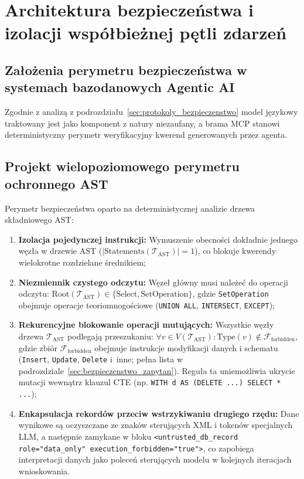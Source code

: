 \section{Architektura bezpieczeństwa i izolacji współbieżnej pętli zdarzeń}
\label{sec:projekt_bezpieczenstwo}

\subsection{Założenia perymetru bezpieczeństwa w systemach bazodanowych Agentic AI}
\label{subsec:projekt_model_zagrozen}

Zgodnie z analizą z podrozdziału~\ref{sec:protokoly_bezpieczenstwo} model językowy traktowany jest jako komponent z natury niezaufany, a brama MCP stanowi deterministyczny perymetr weryfikacyjny kwerend generowanych przez agenta.

\subsection{Projekt wielopoziomowego perymetru ochronnego AST}
\label{subsec:projekt_perymetr_ochronny}

Perymetr bezpieczeństwa oparto na deterministycznej analizie drzewa składniowego AST:
\begin{enumerate}
    \item \textbf{Izolacja pojedynczej instrukcji:} Wymuszenie obecności dokładnie jednego węzła w drzewie AST ($|\text{Statements}(\mathcal{T}_{\text{AST}})| = 1$), co blokuje kwerendy wielokrotne rozdzielane średnikiem;
    \item \textbf{Niezmiennik czystego odczytu:} Węzeł główny musi należeć do operacji odczytu: $\text{Root}(\mathcal{T}_{\text{AST}}) \in \{ \text{Select}, \text{SetOperation} \}$, gdzie \texttt{SetOperation} obejmuje operacje teoriomnogościowe (\texttt{UNION ALL}, \texttt{INTERSECT}, \texttt{EXCEPT});
    \item \textbf{Rekurencyjne blokowanie operacji mutujących:} Wszystkie węzły drzewa $\mathcal{T}_{\text{AST}}$ podlegają przeszukaniu: $\forall v \in V(\mathcal{T}_{\text{AST}}): \text{Type}(v) \notin \mathcal{F}_{\text{forbidden}}$, gdzie zbiór $\mathcal{F}_{\text{forbidden}}$ obejmuje instrukcje modyfikacji danych i schematu (\texttt{Insert}, \texttt{Update}, \texttt{Delete} i~inne; pełna lista w podrozdziale~\ref{sec:bezpieczenstwo_zapytan}). Reguła ta uniemożliwia ukrycie mutacji wewnątrz klauzul CTE (np. \texttt{WITH d AS (DELETE ...) SELECT * ...});
    \item \textbf{Enkapsulacja rekordów przeciw wstrzykiwaniu drugiego rzędu:} Dane wynikowe są oczyszczane ze znaków sterujących XML i tokenów specjalnych LLM, a następnie zamykane w bloku \texttt{<untrusted\_db\_record role="data\_only" execution\_forbidden="true">}, co zapobiega interpretacji danych jako poleceń sterujących modelu w kolejnych iteracjach wnioskowania.
\end{enumerate}


